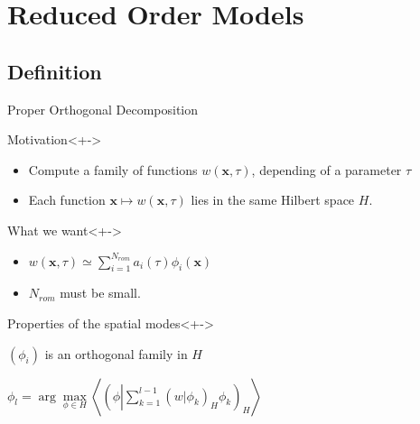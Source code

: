 \section{Reduced Order Models}

\subsection{Definition}

\begin{frame}{Proper Orthogonal Decomposition}
%
\begin{block}{Motivation}<+->
%
\begin{itemize}
\item<+-> Compute a family of functions $w(\mathbf{x},\tau)$, depending of a parameter $\tau$
\item<+-> Each function $\mathbf{x}\mapsto w(\mathbf{x},\tau )$ lies in the same Hilbert space $H$.
\end{itemize}
%
\end{block}
%
\begin{block}{What we want}<+->
\begin{itemize}
\item<+-> $\displaystyle w(\mathbf{x},\tau)\simeq \sum\limits_{i=1}^{N_{rom}}a_i(\tau)\phi_i(\mathbf{x})$
\item<+-> $N_{rom}$ must be small.
\end{itemize}
\end{block}
%
\begin{block}{Properties of the spatial modes}<+->
\begin{description}
\item<+-> [Orthogonality] $(\phi_i)$ is an orthogonal family in $H$
\item<+-> [Optimality of $(\phi_i)$] %
$\phi_l= \arg\max\limits_{\phi\in H}\left\langle\left(\phi\left|\sum\limits_{k=1}^{l-1}\left(w|\phi_k\right)_H\phi_k\right.\right)_H\right\rangle$%
\end{description}
\end{block}
%
\end{frame}

